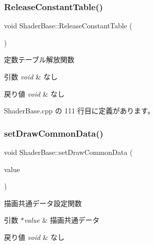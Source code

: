 \subsubsection{\texorpdfstring{Release\+Constant\+Table()}{ReleaseConstantTable()}}
{\footnotesize\ttfamily void Shader\+Base\+::\+Release\+Constant\+Table (\begin{DoxyParamCaption}{ }\end{DoxyParamCaption})\hspace{0.3cm}{\ttfamily [protected]}}



定数テーブル解放関数 


\begin{DoxyParams}{引数}
{\em void} & なし \\
\hline
\end{DoxyParams}

\begin{DoxyRetVals}{戻り値}
{\em void} & なし \\
\hline
\end{DoxyRetVals}


 Shader\+Base.\+cpp の 111 行目に定義があります。

\mbox{\label{class_shader_base_abbffa59fae48651c11489de37a88b190}} 
\subsubsection{\texorpdfstring{set\+Draw\+Common\+Data()}{setDrawCommonData()}}
{\footnotesize\ttfamily void Shader\+Base\+::set\+Draw\+Common\+Data (\begin{DoxyParamCaption}\item[{\mbox{\hyperlink{class_draw_common_data}{Draw\+Common\+Data}} $\ast$}]{value }\end{DoxyParamCaption})}



描画共通データ設定関数 


\begin{DoxyParams}{引数}
{\em $\ast$value} & 描画共通データ \\
\hline
\end{DoxyParams}

\begin{DoxyRetVals}{戻り値}
{\em void} & なし \\
\hline
\end{DoxyRetVals}


